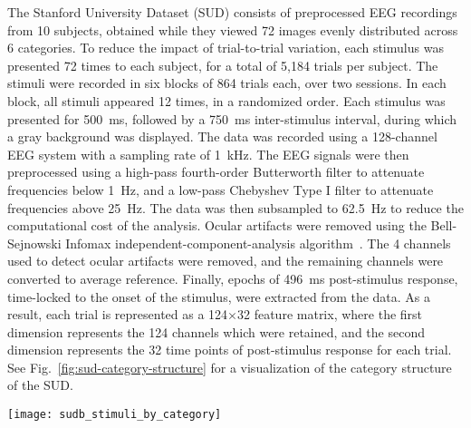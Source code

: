 The Stanford University Dataset (SUD) consists of preprocessed EEG recordings from 10 subjects, obtained while they viewed 72 images evenly distributed across 6 categories. To reduce the impact of trial-to-trial variation, each stimulus was presented 72 times to each subject, for a total of 5,184 trials per subject. The stimuli were recorded in six blocks of 864 trials each, over two sessions. In each block, all stimuli appeared 12 times, in a randomized order. Each stimulus was presented for 500~ms, followed by a 750~ms inter-stimulus interval, during which a gray background was displayed. The data was recorded using a 128-channel EEG system with a sampling rate of 1~kHz. The EEG signals were then preprocessed using a high-pass fourth-order Butterworth filter to attenuate frequencies below 1~Hz, and a low-pass Chebyshev Type I filter to attenuate frequencies above 25~Hz. The data was then subsampled to 62.5~Hz to reduce the computational cost of the analysis. Ocular artifacts were removed using the Bell-Sejnowski Infomax independent-component-analysis algorithm~\cite{Bell-Sejnowski:1995}.  The 4 channels used to detect ocular artifacts were removed, and the remaining channels were converted to average reference. Finally, epochs of 496~ms post-stimulus response, time-locked to the onset of the stimulus, were extracted from the data. As a result, each trial is represented as a 124$\times$32 feature matrix, where the first dimension represents the 124 channels which were retained, and the second dimension represents the 32 time points of post-stimulus response for each trial. See Fig.~\ref{fig:sud-category-structure} for a visualization of the category structure of the SUD. 

\begin{SCfigure}
    \centering
    \texttt{[image: sudb\_stimuli\_by\_category]}
  \caption{\textbf{The category and structure of the SUD stimulus set.} The stimulus set used in the SUD is composed of 72 images of natural objects. These stimuli are evenly distributed across six categories: Human Body (HB), Human Face (HF), Animal Body (AB), Animal Face (AF), Fruit/Vegetable (FV), and Inanimate Object (IO). They additionally possess a coarse hierarchical structure using according to the Animate and Inanimate supercategories. Moreover,  the Animate category can be divided along two semantic : Human vs Animal, and Face vs Body. The colored borders framing each image are intended to clearly delineate object categories across visualizations and were not presented to subjects during the data collection process.\vspace{4.5em}}
  \label{fig:sud-category-structure}
\end{SCfigure}

